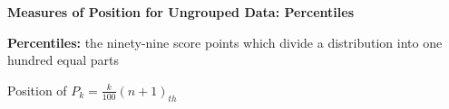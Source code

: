 \begin{center}
\textbf{Measures of Position for Ungrouped Data: Percentiles}
\end{center}

\vspace*{1ex}

\textbf{Percentiles:} the ninety-nine score points which divide a distribution into one hundred equal parts
\begin{center}
Position of $P_k = \displaystyle \frac{k}{100}(n+1)_{th} $
\end{center} 